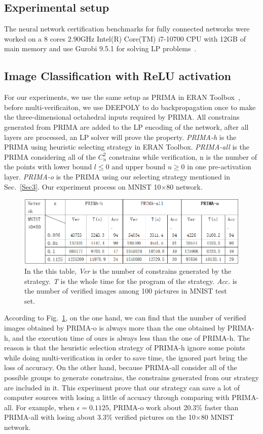 \documentclass[runningheads]{llncs}
\begin{document}
\subsection{Experimental setup}
The neural network certification benchmarks for fully connected networks were worked on a 8 cores 2.90GHz Intel(R) Core(TM) i7-10700 CPU with 12GB of main memory and use Gurobi 9.5.1 for solving LP problems~\cite{ref_url3}.

\subsection{Image Classification with ReLU activation}
For our experiments, we use the same setup as PRIMA in ERAN Toolbox~\cite{ref_url4}, before multi-verificaiton, we use DEEPOLY to do backpropagation once to make the three-dimensional octahedral inputs required by PRIMA. All constrains generated from PRIMA are added to the LP encoding of the network, after all layers are processed, an LP solver will prove the property. \textit{PRIMA-h} is the PRIMA using heuristic selecting strategy in ERAN Toolbox. \textit{PRIMA-all} is the PRIMA considering all of the 
$C_{n}^{2}$ constrains while verification, n is the number of the points with lower bound $l\leq 0$ and upper bound $u\geq 0$ in one pre-activation layer. \textit{PRIMA-o} is the PRIMA using our selecting strategy mentioned in Sec.~\ref{Sec3}. Our experiment process on MNIST 10$\times $80 network.

\begin{figure}
\includegraphics[width=\textwidth]{Fig/FigR3_1.png}
\caption{In the this table, \textit{Ver} is the number of constrains generated by the strategy. \textit{T} is the whole time for the program of the strategy. \textit{Acc.} is the number of verified images among 100 pictures in MNIST test set.} \label{table1}
\end{figure}

According to Fig.~\ref{table1}, on the one hand, we can find that the number of verified images obtained by PRIMA-o is always more than the one obtained by PRIMA-h, and the execution time of ours is always less than  the one of PRIMA-h. The reason is that the heuristic selection strategy of PRIMA-h ignore some points while doing multi-verification in order to save time, the ignored part bring the loss of accuracy. On the other hand, because PRIMA-all consider all of the possible groups to generate constrains, the constrains generated from our strategy are included in it. This experiment prove that our strategy can save a lot of computer sources with losing a little of accuacy through comparing with PRIMA-all. For example, when $\epsilon =0.1125$, PRIMA-o work about 20.3\% faster than PRIMA-all with losing about 3.3\% verified pictures on the 10$\times $80 MNIST network.
\end{document}
